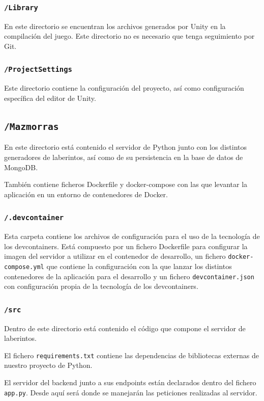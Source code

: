 \subsubsection{\texttt{/Library}}
En este directorio se encuentran los archivos generados por Unity en la compilación del juego. Este directorio no es necesario que tenga seguimiento por Git.

\subsubsection{\texttt{/ProjectSettings}}
Este directorio contiene la configuración del proyecto, así como configuración específica del editor de Unity.


\subsection{\texttt{/Mazmorras}}
En este directorio está contenido el servidor de Python junto con los distintos generadores de laberintos, así como de su persistencia en la base de datos de MongoDB.

También contiene ficheros Dockerfile y docker-compose con las que levantar la aplicación en un entorno de contenedores de Docker.

\subsubsection{\texttt{/.devcontainer}}
Esta carpeta contiene los archivos de configuración para el uso de la tecnología de los devcontainers. Está compuesto por un fichero Dockerfile para configurar la imagen del servidor a utilizar en el contenedor de desarrollo, un fichero \texttt{docker-compose.yml} que contiene la configuración con la que lanzar los distintos contenedores de la aplicación para el desarrollo y un fichero \texttt{devcontainer.json} con configuración propia de la tecnología de los devcontainers.

\subsubsection{\texttt{/src}}
Dentro de este directorio está contenido el código que compone el servidor de laberintos.

El fichero \texttt{requirements.txt} contiene las dependencias de bibliotecas externas de nuestro proyecto de Python.

El servidor del backend junto a sus endpoints están declarados dentro del fichero \texttt{app.py}. Desde aquí será donde se manejarán las peticiones realizadas al servidor.

